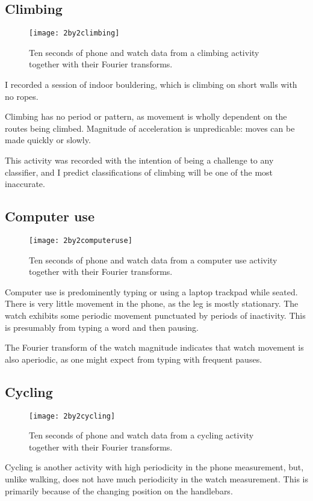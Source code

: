    \subsection{Climbing}
      \begin{figure}[!th]
        \centering
        \texttt{[image: 2by2climbing]}
        \caption{Ten seconds of phone and watch data from a climbing activity together with their Fourier transforms.}
        \label{fig:2by2climbing }
      \end{figure}
      
      I recorded a session of indoor bouldering, which is climbing on short walls with no ropes.
      
      Climbing has no period or pattern, as movement is wholly dependent on the routes being climbed. Magnitude of acceleration is unpredicable: moves can be made quickly or slowly.
      
      This activity was recorded with the intention of being a challenge to any classifier, and I predict classifications of climbing will be one of the most inaccurate.
    \pagebreak[4]
    \subsection{Computer use}
      \begin{figure}[!th]
        \centering
        \texttt{[image: 2by2computeruse]}
        \caption{Ten seconds of phone and watch data from a computer use activity together with their Fourier transforms.}
        \label{fig:2by2computeruse}
      \end{figure}
      
      Computer use is predominently typing or using a laptop trackpad while seated. There is very little movement in the phone, as the leg is mostly stationary. The watch exhibits some periodic movement punctuated by periods of inactivity. This is presumably from typing a word and then pausing.
      
      The Fourier transform of the watch magnitude indicates that watch movement is also aperiodic, as one might expect from typing with frequent pauses. 
    \pagebreak[4]
    \subsection{Cycling}
      \begin{figure}[!th]
        \centering
        \texttt{[image: 2by2cycling]}
        \caption{Ten seconds of phone and watch data from a cycling activity together with their Fourier transforms.}
        \label{fig:2by2cycling}
      \end{figure}
      Cycling is another activity with high periodicity in the phone measurement, but, unlike walking, does not have much periodicity in the watch measurement. This is primarily because of the changing position on the handlebars.
    \pagebreak[4]
